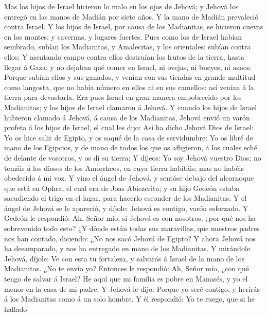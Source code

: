  Mas los hijos de Israel hicieron lo malo en los ojos de
Jehová; y Jehová los entregó en las manos de Madián por siete años.
 Y la mano de Madián prevaleció contra Israel. Y los hijos
de Israel, por causa de los Madianitas, se hicieron cuevas en los
montes, y cavernas, y lugares fuertes.  Pues como los de
Israel habían sembrado, subían los Madianitas, y Amalecitas, y los
orientales: subían contra ellos;  Y asentando campo contra
ellos destruían los frutos de la tierra, hasta llegar á Gaza; y no
dejaban qué comer en Israel, ni ovejas, ni bueyes, ni asnos.
 Porque subían ellos y sus ganados, y venían con sus
tiendas en grande multitud como langosta, que no había número en ellos
ni en sus camellos: así venían á la tierra para devastarla.
 Era pues Israel en gran manera empobrecido por los
Madianitas; y los hijos de Israel clamaron á Jehová.  Y
cuando los hijos de Israel hubieron clamado á Jehová, á causa de los
Madianitas,  Jehová envió un varón profeta á los hijos de
Israel, el cual les dijo: Así ha dicho Jehová Dios de Israel: Yo os hice
salir de Egipto, y os saqué de la casa de servidumbre:  Yo
os libré de mano de los Egipcios, y de mano de todos los que os
afligieron, á los cuales eché de delante de vosotros, y os dí su tierra;
 Y díjeos: Yo soy Jehová vuestro Dios; no temáis á los
dioses de los Amorrheos, en cuya tierra habitáis: mas no habéis
obedecido á mi voz.  Y vino el ángel de Jehová, y sentóse
debajo del alcornoque que está en Ophra, el cual era de Joas Abiezerita;
y su hijo Gedeón estaba sacudiendo el trigo en el lagar, para hacerlo
esconder de los Madianitas.  Y el ángel de Jehová se le
apareció, y díjole: Jehová es contigo, varón esforzado. 
Y Gedeón le respondió: Ah, Señor mío, si Jehová es con nosotros, ¿por
qué nos ha sobrevenido todo esto? ¿Y dónde están todas sus maravillas,
que nuestros padres nos han contado, diciendo: ¿No nos sacó Jehová de
Egipto? Y ahora Jehová nos ha desamparado, y nos ha entregado en mano de
los Madianitas.  Y mirándole Jehová, díjole: Ve con esta
tu fortaleza, y salvarás á Israel de la mano de los Madianitas. ¿No te
envío yo?  Entonces le respondió: Ah, Señor mío, ¿con qué
tengo de salvar á Israel? He aquí que mi familia es pobre en Manasés, y
yo el menor en la casa de mi padre.  Y Jehová le dijo:
Porque yo seré contigo, y herirás á los Madianitas como á un solo
hombre.  Y él respondió: Yo te ruego, que si he hallado
